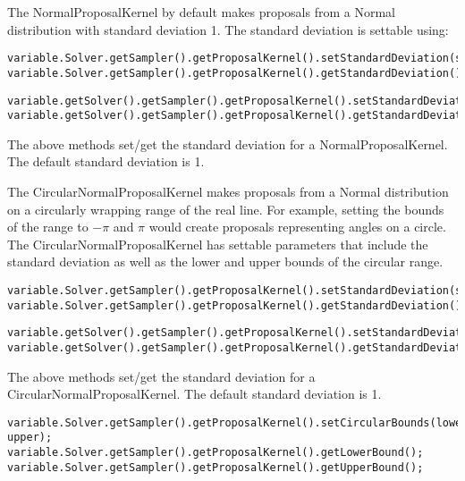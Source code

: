 The NormalProposalKernel by default makes proposals from a Normal distribution with standard deviation 1.  The standard deviation is settable using:

\ifmatlab
\begin{lstlisting}
variable.Solver.getSampler().getProposalKernel().setStandardDeviation(std);
variable.Solver.getSampler().getProposalKernel().getStandardDeviation();
\end{lstlisting}
\fi

\ifjava
\begin{lstlisting}
variable.getSolver().getSampler().getProposalKernel().setStandardDeviation(std);
variable.getSolver().getSampler().getProposalKernel().getStandardDeviation();
\end{lstlisting}
\fi

The above methods set/get the standard deviation for a NormalProposalKernel.  The default standard deviation is 1.

The CircularNormalProposalKernel makes proposals from a Normal distribution on a circularly wrapping range of the real line.  For example, setting the bounds of the range to $-\pi$ and $\pi$ would create proposals representing angles on a circle.  The CircularNormalProposalKernel has settable parameters that include the standard deviation as well as the lower and upper bounds of the circular range.

\ifmatlab
\begin{lstlisting}
variable.Solver.getSampler().getProposalKernel().setStandardDeviation(std);
variable.Solver.getSampler().getProposalKernel().getStandardDeviation();
\end{lstlisting}
\fi

\ifjava
\begin{lstlisting}
variable.getSolver().getSampler().getProposalKernel().setStandardDeviation(std);
variable.getSolver().getSampler().getProposalKernel().getStandardDeviation();
\end{lstlisting}
\fi

The above methods set/get the standard deviation for a CircularNormalProposalKernel.  The default standard deviation is 1.

\ifmatlab
\begin{lstlisting}
variable.Solver.getSampler().getProposalKernel().setCircularBounds(lower, upper);
variable.Solver.getSampler().getProposalKernel().getLowerBound();
variable.Solver.getSampler().getProposalKernel().getUpperBound();
\end{lstlisting}
\fi

